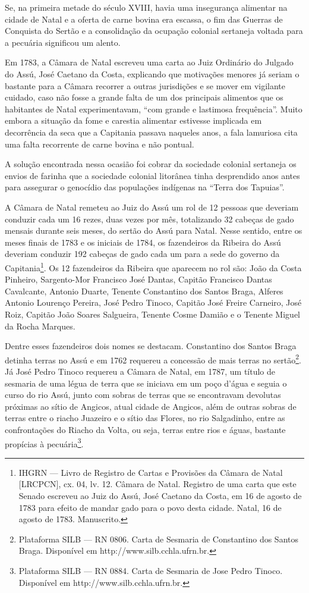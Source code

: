 \begin{refsection}
Se, na primeira metade do século XVIII, havia uma insegurança alimentar na cidade de Natal e a oferta de carne bovina era escassa, o fim das Guerras de Conquista do Sertão e a consolidação da ocupação colonial sertaneja voltada para a pecuária significou um alento.

Em 1783, a Câmara de Natal escreveu uma carta ao Juiz Ordinário do Julgado do Assú, José Caetano da Costa, explicando que motivações menores já seriam o bastante para a Câmara recorrer a outras jurisdições e se mover em vigilante cuidado, caso não fosse a grande falta de um dos principais alimentos que os habitantes de Natal experimentavam, “com grande e lastimosa frequência”. Muito embora a situação da fome e carestia alimentar estivesse implicada em decorrência da seca que a Capitania passava naqueles anos, a fala lamuriosa cita uma falta recorrente de carne bovina e não pontual.

A solução encontrada nessa ocasião foi cobrar da sociedade colonial sertaneja os envios de farinha que a sociedade colonial litorânea tinha desprendido anos antes para assegurar o genocídio das populações indígenas na ``Terra dos Tapuias''.

A Câmara de Natal remeteu ao Juiz do Assú um rol de 12 pessoas que deveriam conduzir cada um 16 rezes, duas vezes por mês, totalizando 32 cabeças de gado mensais durante seis meses, do sertão do Assú para Natal. Nesse sentido, entre os meses finais de 1783 e os iniciais de 1784, os fazendeiros da Ribeira do Assú deveriam conduzir 192 cabeças de gado cada um para a sede do governo da Capitania\footnote{IHGRN --- Livro de Registro de Cartas e Provisões da Câmara de Natal [LRCPCN], cx. 04, lv. 12. Câmara de Natal. Registro de uma carta que este Senado escreveu ao Juiz do Assú, José Caetano da Costa, em 16 de agosto de 1783 para efeito de mandar gado para o povo desta cidade. Natal, 16 de agosto de 1783. Manuscrito.}. Os 12 fazendeiros da Ribeira que aparecem no rol são: João da Costa Pinheiro, Sargento-Mor Francisco José Dantas, Capitão Francisco Dantas Cavalcante, Antonio Duarte, Tenente Constantino dos Santos Braga, Alferes Antonio Lourenço Pereira, José Pedro Tinoco, Capitão José Freire Carneiro, José Roiz, Capitão João Soares Salgueira, Tenente Cosme Damião e o Tenente Miguel da Rocha Marques.

Dentre esses fazendeiros dois nomes se destacam. Constantino dos Santos Braga detinha terras no Assú e em 1762 requereu a concessão de mais terras no sertão\footnote{Plataforma SILB — RN 0806. Carta de Sesmaria de Constantino dos Santos Braga. Disponível em http://www.silb.cchla.ufrn.br.}. Já José Pedro Tinoco requereu a Câmara de Natal, em 1787, um título de sesmaria de uma légua de terra que se iniciava em um poço d’água e seguia o curso do rio Assú, junto com sobras de terras que se encontravam devolutas próximas ao sítio de Angicos, atual cidade de Angicos, além de outras sobras de terras entre o riacho Juazeiro e o sítio das Flores, no rio Salgadinho, entre as confrontações do Riacho da Volta, ou seja, terras entre rios e águas, bastante propícias à pecuária\footnote{Plataforma SILB — RN 0884. Carta de Sesmaria de Jose Pedro Tinoco. Disponível em http://www.silb.cchla.ufrn.br.}.


\end{refsection}
